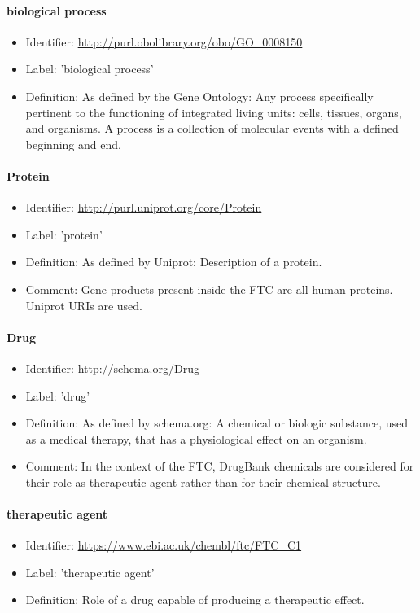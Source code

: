 \paragraph{biological process}
\begin{itemize}
  \item Identifier: \url{http://purl.obolibrary.org/obo/GO\_0008150}
  \item Label: 'biological process'
  \item Definition: As defined by the Gene Ontology: Any process specifically pertinent to the functioning of integrated living units: cells, tissues, organs, and organisms. A process is a collection of molecular events with a defined beginning and end.
\end{itemize}

\paragraph{Protein}
\begin{itemize}
  \item Identifier: \url{http://purl.uniprot.org/core/Protein}
  \item Label: 'protein'
  \item Definition: As defined by Uniprot: Description of a protein.
  \item Comment: Gene products present inside the FTC are all human proteins. Uniprot URIs are used.
\end{itemize}

\paragraph{Drug}
\begin{itemize}
  \item Identifier: \url{http://schema.org/Drug}
  \item Label: 'drug'
  \item Definition: As defined by schema.org: A chemical or biologic substance, used as a medical therapy, that has a physiological effect on an organism.
  \item Comment: In the context of the FTC, DrugBank chemicals are considered for their role as therapeutic agent rather than for their chemical structure.
\end{itemize}

\paragraph{therapeutic agent}
\begin{itemize}
  \item Identifier: \url{https://www.ebi.ac.uk/chembl/ftc/FTC\_C1}
  \item Label: 'therapeutic agent'
  \item Definition: Role of a drug capable of producing a therapeutic effect.
\end{itemize}

